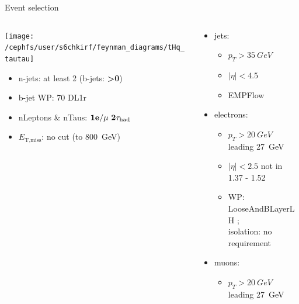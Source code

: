 \documentclass[10pt, UKenglish]{beamer}
\begin{document}
\begin{frame}{Event selection}
    \begin{columns}
      \begin{column}{0.5\textwidth}
        \centering \texttt{[image: /cephfs/user/s6chkirf/feynman\_diagrams/tHq\_tautau]}\\
                \begin{itemize}
          \item n-jets: at least 2 (b-jets: \textbf{>0})
          \item b-jet WP: 70 DL1r
          \item nLeptons \& nTaus: $\bf{1e / \mu~2\tau_{\text{had}}} $
          \item $E_{\text{T,miss}}$: no cut (to \SI{800}{GeV})
        \end{itemize}
      \end{column}
      \begin{column}{0.7\textwidth}
        \vspace*{-0.05\textwidth}
        \begin{itemize}
          \footnotesize
          \item jets:
          \vspace*{-0.02\textwidth}
          \begin{itemize}
            \footnotesize
            \item $p_T>\SI{35}{GeV}$
            \item $|\eta|<4.5$
            \item EMPFlow
          \end{itemize}
          \item electrons:
          \vspace*{-0.02\textwidth}
          \begin{itemize}
            \footnotesize
            \item $p_T>\SI{20}{GeV}$ leading \SI{27}{GeV}
            \item $|\eta|<2.5$ not in 1.37 - 1.52
            \item WP: LooseAndBLayerLH ; \\isolation: no requirement
          \end{itemize}
          \item muons:
          \vspace*{-0.02\textwidth}
          \begin{itemize}
            \footnotesize
            \item $p_T>\SI{20}{GeV}$ leading \SI{27}{GeV}

\end{itemize}
\end{itemize}
\end{column}
\end{columns}
\end{frame}
\end{document}
